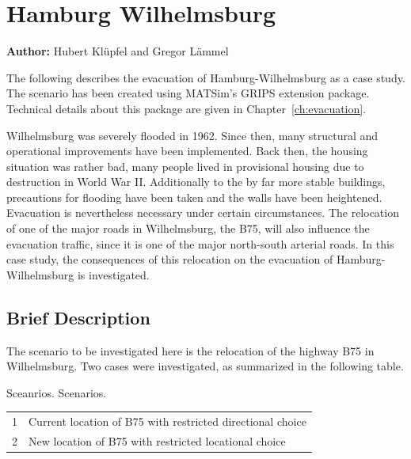 
%
\section{Hamburg Wilhelmsburg}\label{ch:sc:hhw}
\hfill \textbf{Author:} Hubert Kl\"upfel and Gregor L\"ammel

The following describes the evacuation of Hamburg-Wilhelmsburg as a case study. 
The scenario has been created using MATSim's GRIPS extension package. Technical details about this package are given in Chapter~\ref{ch:evacuation}. 

Wilhelmsburg was severely flooded in 1962. Since then, many structural and operational improvements have been implemented. Back then, the housing situation was rather bad, many people lived in provisional housing due to destruction in World War II. Additionally to the by far more stable buildings, precautions for flooding have been taken and the walls have been heightened. Evacuation is nevertheless necessary under certain circumstances. The relocation of one of the major roads in Wilhelmsburg, the B75, will also influence the evacuation traffic, since it is one of the major north-south arterial roads. In this case study, the consequences of this relocation on the evacuation of Hamburg-Wilhelmsburg is investigated.

\subsection{Brief Description}

The scenario to be investigated here is the relocation of the highway B75 in Wilhelmsburg. 
Two cases were investigated, as summarized in the following table.

\createtable%
{Sceanrios.}%
{Scenarios.}%
{\label{table:b75scenarios}}%
{%
\begin{tabular}{|l | l|}
\hline
1 & Current location of B75 with restricted directional choice\\
2 & New location of B75 with restricted locational choice\\
\hline
\end{tabular}
}%
{}%

